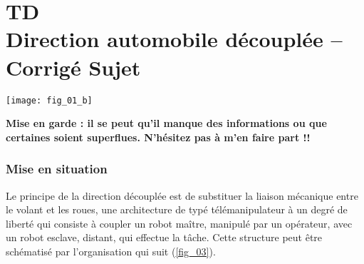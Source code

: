 \chapter*{TD  \\ 
Direction automobile découplée -- \ifprof Corrigé \else Sujet \fi}


\iflivret {} \else
\ifprof  {} \else \fi
\fi
\setcounter{question}{0}

\begin{marginfigure}
\centering
\texttt{[image: fig\_01\_b]}
\end{marginfigure}





\textbf{Mise en garde : il se peut qu'il manque des informations ou que certaines soient superflues. N'hésitez pas à m'en faire part !!}



\subsection*{Mise en situation}

Le principe de la direction découplée est de substituer la liaison mécanique entre le volant et les roues, une architecture de typé télémanipulateur à un degré de liberté qui consiste à coupler un robot maître, manipulé par un opérateur, avec un robot esclave, distant, qui effectue la tâche. Cette structure peut être schématisé par l'organisation qui suit (\autoref{fig_03}).

